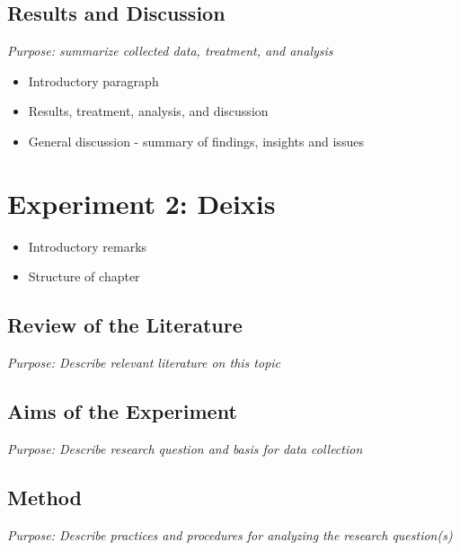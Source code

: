 \subsection{Results and Discussion}
\label{resultsanddiscussion}

\emph{Purpose: summarize collected data, treatment, and analysis}

\begin{itemize}
\item Introductory paragraph

\item Results, treatment, analysis, and discussion

\item General discussion - summary of findings, insights and issues

\end{itemize}

\section{Experiment 2: Deixis}
\label{experiment2:deixis}

\begin{itemize}
\item Introductory remarks

\item Structure of chapter

\end{itemize}

\subsection{Review of the Literature}
\label{reviewoftheliterature}

\emph{Purpose: Describe relevant literature on this topic}

\subsection{Aims of the Experiment}
\label{aimsoftheexperiment}

\emph{Purpose: Describe research question and basis for data collection}

\subsection{Method}
\label{method}

\emph{Purpose: Describe practices and procedures for analyzing the research question(s)}

